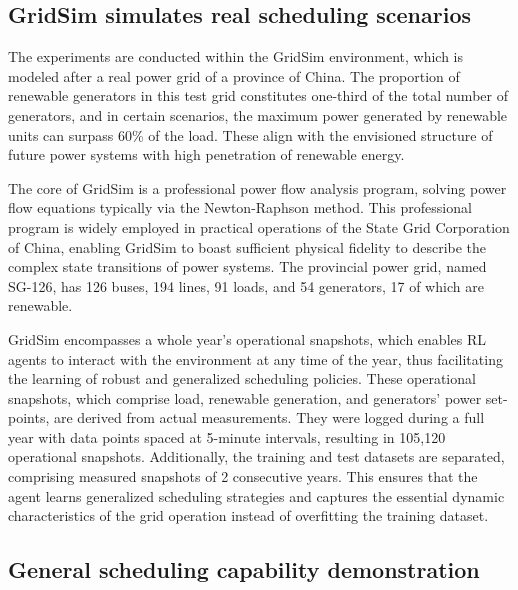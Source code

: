 \subsection*{GridSim simulates real scheduling scenarios} 
The experiments are conducted within the GridSim environment, which is modeled after a real power grid of a province of China.
The proportion of renewable generators in this test grid constitutes one-third of the total number of generators, and in certain scenarios, the maximum power generated by renewable units can surpass 60\% of the load. These align with the envisioned structure of future power systems with high penetration of renewable energy.


The core of GridSim is a professional power flow analysis program, solving power flow equations typically via the Newton-Raphson method\cite{wood2013power}. This professional program is widely employed in practical operations of the State Grid Corporation of China, enabling GridSim to boast sufficient physical fidelity to describe the complex state transitions of power systems. The provincial power grid, named SG-126, has 126 buses, 194 lines, 91 loads, and 54 generators, 17 of which are renewable. 


GridSim encompasses a whole year's operational snapshots, which enables RL agents to interact with the environment at any time of the year, thus facilitating the learning of robust and generalized scheduling policies.
These operational snapshots, which comprise load, renewable generation, and generators' power set-points, are derived from actual measurements. They were logged during a full year with data points spaced at 5-minute intervals, resulting in 105,120 operational snapshots. Additionally, the training and test datasets are separated, comprising measured snapshots of 2 consecutive years. This ensures that the agent learns generalized scheduling strategies and captures the essential dynamic characteristics of the grid operation instead of overfitting the training dataset. 


\subsection*{General scheduling capability demonstration}

